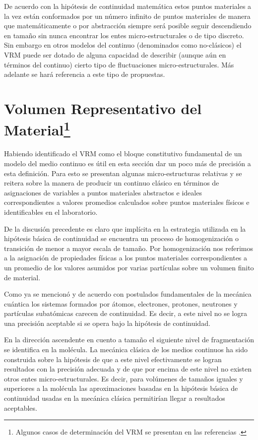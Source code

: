 \documentclass[../notas medios.tex]{subfiles}
\begin{document}
De acuerdo con la hipótesis de continuidad matemática estos puntos materiales a 
la vez están conformados por un número infinito de puntos materiales de manera 
que matemáticamente o por abstracción siempre será posible seguir descendiendo 
en tamaño sin nunca encontrar los entes micro-estructurales o de tipo discreto. 
Sin embargo en otros modelos del continuo (denominados como no-clásicos) el VRM 
puede ser dotado de alguna capacidad de describir (aunque aún en términos del 
continuo) cierto tipo de fluctuaciones micro-estructurales.  Más adelante se 
hará referencia a este tipo de propuestas.

\section*{Volumen Representativo del Material\footnote{Algunos casos de 
determinación del VRM se presentan en las referencias 
\cite{bonda1996effect,bonda1992deformation}.}}

Habiendo identificado el VRM como el bloque constitutivo fundamental de un
modelo del medio continuo es útil en esta sección dar un poco más de precisión
a esta definición.  Para esto se presentan algunas micro-estructuras relativas 
y se reitera sobre la manera de producir un continuo clásico en términos de 
asignaciones de variables a puntos materiales abstractos e ideales 
correspondientes a valores promedios calculados sobre puntos materiales físicos 
e identificables en el laboratorio.

De la discusión precedente es claro que implícita en la estrategia utilizada en 
la hipótesis básica de continuidad se encuentra un proceso de homogenización o 
transición de menor a mayor escala de tamaño.  Por homogenización nos referimos 
a la asignación de propiedades físicas a los puntos materiales correspondientes 
a un promedio de los valores asumidos por varias partículas sobre un volumen 
finito de material.

Como ya se mencionó y de acuerdo con postulados fundamentales de la mecánica cuántica los sistemas formados por átomos, electrones, protones, neutrones y partículas subatómicas carecen de continuidad.  Es decir, a este nivel no se logra una precisión aceptable si se opera bajo la hipótesis de continuidad.

En la dirección ascendente en cuento a tamaño el siguiente nivel de fragmentación se identifica en la molécula.  La mecánica clásica de los medios continuos ha sido construida sobre la hipótesis de que a este nivel efectivamente se logran resultados con la precisión adecuada y de que por encima de este nivel no existen otros entes micro-estructurales.  Es decir, para volúmenes de tamaños iguales y superiores a la molécula las aproximaciones basadas en la hipótesis básica de continuidad usadas en la mecánica clásica permitirían llegar a resultados aceptables.
\end{document}
